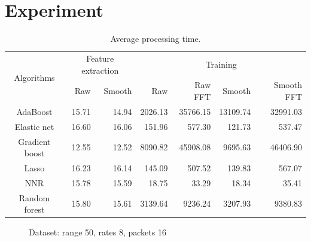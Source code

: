 \section{Experiment}

\begin{table}[htpb]
   \centering
   \caption{Average processing time.}
   \label{tab:timing}
   \begin{tabular}{|c|r|r|r|r|r|r|}
      \hline
      \multirow{2}{*}{Algorithms} & \multicolumn{2}{c|}{Feature extraction} &
      \multicolumn{4}{c|}{Training} \\ \cline{2-7}
                     & Raw   & Smooth & Raw     & Raw FFT  & Smooth   & Smooth FFT \\ \hline
      AdaBoost       & 15.71 & 14.94  & 2026.13 & 35766.15 & 13109.74 & 32991.03\\
      Elastic net    & 16.60 & 16.06  & 151.96  & 577.30   & 121.73   & 537.47\\
      Gradient boost & 12.55 & 12.52  & 8090.82 & 45908.08 & 9695.63  & 46406.90\\
      Lasso          & 16.23 & 16.14  & 145.09  & 507.52   & 139.83   & 567.07\\
      NNR            & 15.78 & 15.59  & 18.75   & 33.29    & 18.34    & 35.41\\
      Random forest  & 15.80 & 15.61  & 3139.64 & 9236.24  & 3207.93  & 9380.83\\
      \hline
   \end{tabular}
\end{table}


\begin{figure}[htpb]
   \centering
   \quad
   \caption{Dataset: range 50, rates 8, packets 16}
   \label{fig:exp4}
\end{figure}

